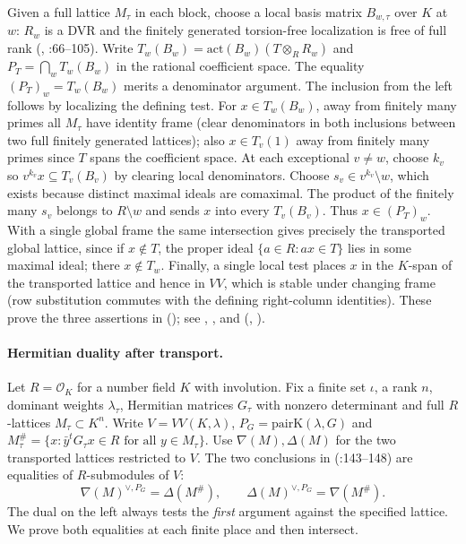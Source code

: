 Given a full lattice $M_\tau$ in each block, choose a local basis
matrix $B_{w,\tau}$ over $K$ at $w$: $R_w$ is a DVR and the finitely
generated torsion-free localization is free of full rank
(,
:66--105). Write
$T_w(B_w)=\mathrm{act}(B_w)(T\otimes_R R_w)$ and
$P_T=\bigcap_w T_w(B_w)$ in the rational coefficient space.
The equality $(P_T)_w=T_w(B_w)$ merits a denominator argument.
The inclusion from the left follows by localizing the defining test.
For $x\in T_w(B_w)$, away from finitely many primes all $M_\tau$
have identity frame (clear denominators in both inclusions between
two full finitely generated lattices); also $x\in T_v(1)$ away from
finitely many primes since $T$ spans the coefficient space. At each
exceptional $v\ne w$, choose $k_v$ so $v^{k_v}x\subseteq T_v(B_v)$
by clearing local denominators. Choose $s_v\in v^{k_v}\setminus w$,
which exists because distinct maximal ideals are comaximal.
The product of the finitely many $s_v$ belongs to $R\setminus w$
and sends $x$ into every $T_v(B_v)$. Thus $x\in(P_T)_w$. With a
single global frame the same intersection gives precisely the transported
global lattice, since if $x\notin T$, the proper ideal
$\{a\in R:ax\in T\}$ lies in some maximal ideal; there $x\notin T_w$.
Finally, a single local test places $x$ in the $K$-span of the
transported lattice and hence in $VV$, which is stable under changing
frame (row substitution commutes with the defining right-column identities).
These prove the three assertions in
();
see , , 
and 
(,
).

\paragraph{Hermitian duality after transport.}\label{r13:weyl-dual}
Let $R=\mathcal O_K$ for a number field $K$ with involution. Fix a
finite set $\iota$, a rank $n$, dominant weights $\lambda_\tau$,
Hermitian matrices $G_\tau$ with nonzero determinant and full
$R$-lattices $M_\tau\subset K^n$. Write $V=VV(K,\lambda)$,
$P_G=\mathrm{pairK}(\lambda,G)$ and
$M_\tau^\#=\{x:\bar y^tG_\tau x\in R\text{ for all }y\in M_\tau\}$.
Use $\nabla(M),\Delta(M)$ for the two transported lattices restricted
to $V$. The two conclusions in 
(:143--148) are equalities of $R$-submodules of $V$:
\[
 \nabla(M)^{\vee,P_G}=\Delta(M^\#),\qquad
 \Delta(M)^{\vee,P_G}=\nabla(M^\#).
\]
The dual on the left always tests the \emph{first} argument against
the specified lattice. We prove both equalities at each finite place and
then intersect.

